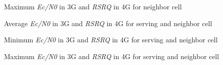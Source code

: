 %
{Maximum \textit{Ec/N0} in 3G and \textit{RSRQ} in 4G for neighbor cell}


%
{Average \textit{Ec/N0} in 3G and \textit{RSRQ} in 4G for serving and neighbor cell}

%
{Minimum \textit{Ec/N0} in 3G and \textit{RSRQ} in 4G for serving and neighbor cell}

%
{Maximum \textit{Ec/N0} in 3G and \textit{RSRQ} in 4G for serving and neighbor cell}


